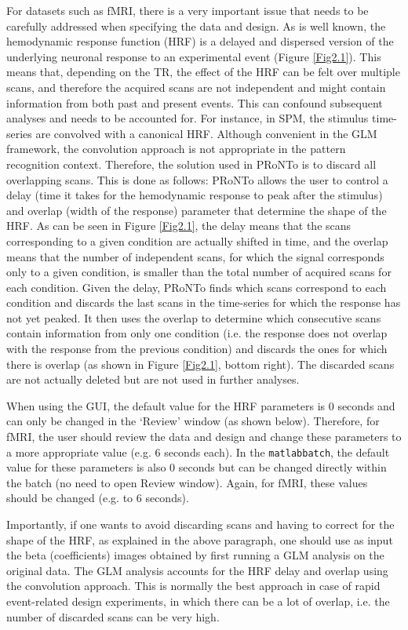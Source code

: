 For datasets such as fMRI, there is a very important issue that needs to be carefully addressed when specifying the data and design. As is well known, the hemodynamic response function (HRF) is a delayed and dispersed version of the underlying neuronal response to an experimental event (Figure \ref{Fig2.1}). This means that, depending on the TR, the effect of the HRF can be felt over multiple scans, and therefore the acquired scans are not independent and might contain information from both past and present events. This can confound subsequent analyses and needs to be accounted for. For instance, in SPM, the stimulus time-series are convolved with a canonical HRF. Although convenient in the GLM framework, the convolution approach is not appropriate in the pattern recognition context. Therefore, the solution used in PRoNTo is to discard all overlapping scans. This is done as follows: PRoNTo allows the user to control a delay (time it takes for the hemodynamic response to peak after the stimulus) and overlap (width of the response) parameter that determine the shape of the HRF. As can be seen in Figure \ref{Fig2.1}, the delay means that the scans corresponding to a given condition are actually shifted in time, and the overlap means that the number of independent scans, for which the signal corresponds only to a given condition, is smaller than the total number of acquired scans for each condition. Given the delay, PRoNTo finds which scans correspond to each condition and discards the last scans in the time-series for which the response has not yet peaked. It then uses the overlap to determine which consecutive scans contain information from only one condition (i.e. the response does not overlap with the response from the previous condition) and discards the ones for which there is overlap (as shown in Figure \ref{Fig2.1}, bottom right). The discarded scans are not actually deleted but are not used in further analyses.

When using the GUI, the default value for the HRF parameters is 0 seconds and can only be changed in the `Review' window (as shown below). Therefore, for fMRI, the user should review the data and design and change these parameters to a more appropriate value (e.g. 6 seconds each). In the {\tt matlabbatch}, the default value for these parameters is also 0 seconds but can be changed directly within the batch (no need to open Review window). Again, for fMRI, these values should be changed (e.g. to 6 seconds).

Importantly, if one wants to avoid discarding scans and having to correct for the shape of the HRF, as explained in the above paragraph, one should use as input the beta (coefficients) images obtained by first running a GLM analysis on the original data. The GLM analysis accounts for the HRF delay and overlap using the convolution approach. This is normally the best approach in case of rapid event-related design experiments, in which there can be a lot of overlap, i.e. the number of discarded scans can be very high.

